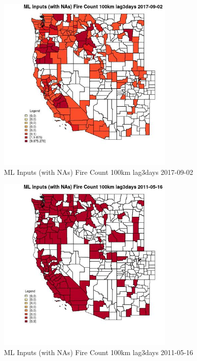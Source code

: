 \begin{figure} 
\centering  
\includegraphics[width=0.77\textwidth]{Code_Outputs/Report_ML_input_PM25_Step4_part_e_de_duplicated_aves_compiled_2019-05-20wNAs_CountyFire_Count_100km_lag3daysMean2017-09-02.jpg} 
\caption{\label{fig:Report_ML_input_PM25_Step4_part_e_de_duplicated_aves_compiled_2019-05-20wNAsCountyFire_Count_100km_lag3daysMean2017-09-02}ML Inputs (with NAs) Fire Count 100km lag3days 2017-09-02} 
\end{figure} 
 

\begin{figure} 
\centering  
\includegraphics[width=0.77\textwidth]{Code_Outputs/Report_ML_input_PM25_Step4_part_e_de_duplicated_aves_compiled_2019-05-20wNAs_CountyFire_Count_100km_lag3daysMean2011-05-16.jpg} 
\caption{\label{fig:Report_ML_input_PM25_Step4_part_e_de_duplicated_aves_compiled_2019-05-20wNAsCountyFire_Count_100km_lag3daysMean2011-05-16}ML Inputs (with NAs) Fire Count 100km lag3days 2011-05-16} 
\end{figure} 
 

